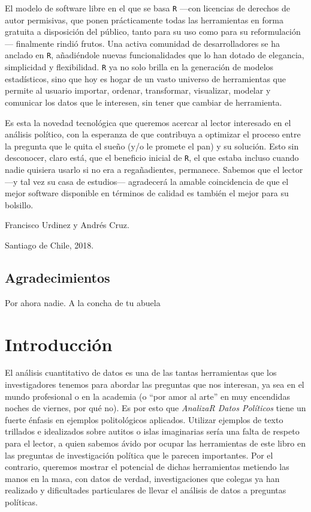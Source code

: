 \documentclass[]{book}
\begin{document}
El modelo de software libre en el que se basa \texttt{R} ---con
licencias de derechos de autor permisivas, que ponen prácticamente todas
las herramientas en forma gratuita a disposición del público, tanto para
su uso como para su reformulación--- finalmente rindió frutos. Una
activa comunidad de desarrolladores se ha anclado en \texttt{R},
añadiéndole nuevas funcionalidades que lo han dotado de elegancia,
simplicidad y flexibilidad. \texttt{R} ya no solo brilla en la
generación de modelos estadísticos, sino que hoy es hogar de un vasto
universo de herramientas que permite al usuario importar, ordenar,
transformar, visualizar, modelar y comunicar los datos que le interesen,
sin tener que cambiar de herramienta.

Es esta la novedad tecnológica que queremos acercar al lector interesado
en el análisis político, con la esperanza de que contribuya a optimizar
el proceso entre la pregunta que le quita el sueño (y/o le promete el
pan) y su solución. Esto sin desconocer, claro está, que el beneficio
inicial de \texttt{R}, el que estaba incluso cuando nadie quisiera
usarlo si no era a regañadientes, permanece. Sabemos que el lector ---y
tal vez su casa de estudios--- agradecerá la amable coincidencia de que
el mejor software disponible en términos de calidad es también el mejor
para su bolsillo.

Francisco Urdinez y Andrés Cruz.

Santiago de Chile, 2018.

\hypertarget{agradecimientos}{%
\section{Agradecimientos}\label{agradecimientos}}

Por ahora nadie. A la concha de tu abuela

\hypertarget{introduccion}{%
\chapter{Introducción}\label{introduccion}}

El análisis cuantitativo de datos es una de las tantas herramientas que
los investigadores tenemos para abordar las preguntas que nos interesan,
ya sea en el mundo profesional o en la academia (o ``por amor al arte''
en muy encendidas noches de viernes, por qué no). Es por esto que
\emph{AnalizaR Datos Políticos} tiene un fuerte énfasis en ejemplos
politológicos aplicados. Utilizar ejemplos de texto trillados e
idealizados sobre autitos o islas imaginarias sería una falta de respeto
para el lector, a quien sabemos ávido por ocupar las herramientas de
este libro en las preguntas de investigación política que le parecen
importantes. Por el contrario, queremos mostrar el potencial de dichas
herramientas metiendo las manos en la masa, con datos de verdad,
investigaciones que colegas ya han realizado y dificultades particulares
de llevar el análisis de datos a preguntas políticas.
\end{document}
